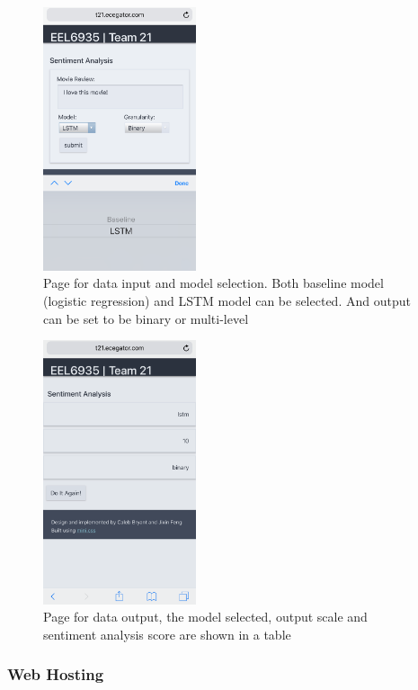 \documentclass[conference]{IEEEtran}
\begin{document}
    \begin{figure}
        \center\includegraphics[width=0.4\textwidth]{figure/flask_input}
        \caption{Page for data input and model selection. Both baseline model (logistic
        regression) and LSTM model can be selected. And output can be set to be binary 
        or multi-level}
        \label{fig:flask_in}
    \end{figure}
    
    \begin{figure}
        \center\includegraphics[width=0.4\textwidth]{figure/flask_output}
        \caption{Page for data output, the model selected, output scale and
        sentiment analysis score are shown in a table}
        \label{fig:flask_out}
    \end{figure}
    
\subsubsection{Web Hosting}
\label{model:front:host}
\end{document}
